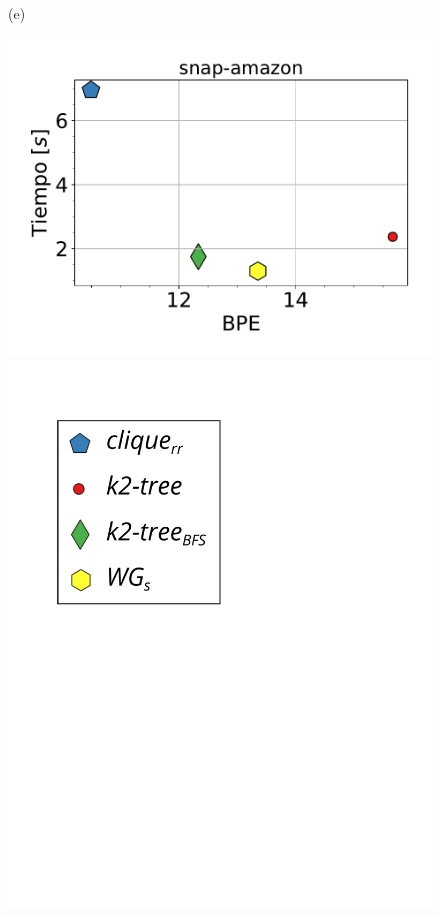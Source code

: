 \begin{figure}
\begin{minipage}{1\textwidth}
\begin{minipage}{0.45\textwidth}
    			(e)
    		\end{minipage}
    		\begin{minipage}{0.45\textwidth}
    			\centering
    			\begin{minipage}{0.75\textwidth}
    				\centering
    				\includegraphics[width=1\linewidth]{img/bpeTimes/secuencial/snap-amazon.pdf}
    			\end{minipage}
    			\begin{minipage}{0.2\textwidth}
    				\centering
    				\includegraphics[scale=.2, clip, trim=60 194 0 0]{img/bpeTimes/labelSec.pdf}
    			\end{minipage}
    			

\end{minipage}
\end{minipage}
\end{figure}
